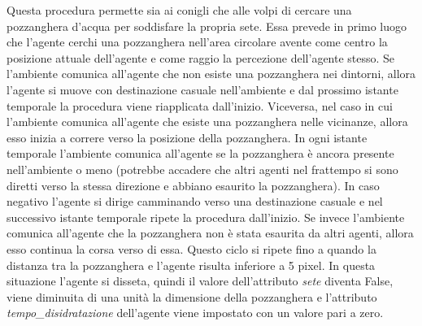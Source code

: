 \documentclass[11pt]{article}
\begin{document}
Questa procedura permette sia ai conigli che alle volpi di cercare una pozzanghera d'acqua per soddisfare la propria sete. Essa prevede in primo luogo che l'agente cerchi una pozzanghera nell'area circolare avente come centro la posizione attuale dell'agente e come raggio la percezione dell'agente stesso. Se l'ambiente comunica all'agente che non esiste una pozzanghera nei dintorni, allora l'agente si muove con destinazione casuale nell'ambiente e dal prossimo istante temporale la procedura viene riapplicata dall'inizio. Viceversa, nel caso in cui l'ambiente comunica all'agente che esiste una pozzanghera nelle vicinanze, allora esso inizia a correre verso la posizione della pozzanghera. In ogni istante temporale l'ambiente comunica all'agente se la pozzanghera è ancora presente nell'ambiente o meno (potrebbe accadere che altri agenti nel frattempo si sono diretti verso la stessa direzione e abbiano esaurito la pozzanghera). In caso negativo l'agente si dirige camminando verso una destinazione casuale e nel successivo istante temporale ripete la procedura dall'inizio. Se invece l'ambiente comunica all'agente che la pozzanghera non è stata esaurita da altri agenti, allora esso continua la corsa verso di essa. Questo ciclo si ripete fino a quando la distanza tra la pozzanghera e l'agente risulta inferiore a 5 pixel. In questa situazione l'agente si disseta, quindi il valore dell'attributo \emph{sete} diventa False, viene diminuita di una unità la dimensione della pozzanghera e l'attributo \emph{tempo\_disidratazione} dell'agente viene impostato con un valore pari a zero. 
\end{document}
